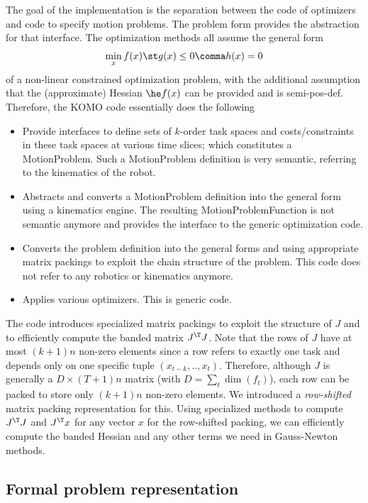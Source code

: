 \documentclass[10pt,fleqn,twoside]{article}
\begin{document}
{{The goal of the implementation is the separation between the code of
optimizers and code to specify motion problems. The problem
form  provides the abstraction for that interface. The
optimization methods all assume the general form
\begin{align}\label{eqOpt}
\min_x f(x) \st g(x)\le 0 \comma h(x) = 0
\end{align}
of a non-linear constrained optimization problem, with the additional
assumption that the (approximate) Hessian $\he f(x)$ can be provided
and is semi-pos-def. Therefore, the KOMO code essentially does the
following
\begin{itemize}
\item Provide interfaces to define sets of $k$-order task spaces and
costs/constraints in these task spaces at various time slices; which
constitutes a MotionProblem. Such a MotionProblem definition is very
semantic, referring to the kinematics of the robot.
\item Abstracts and converts a MotionProblem definition into the general
form  using a kinematics engine. The resulting
MotionProblemFunction is not semantic anymore and provides the
interface to the generic optimization code.
\item Converts the problem definition  into the general
forms  and  using appropriate matrix packings
to exploit the chain structure of the problem. This code does not
refer to any robotics or kinematics anymore.
\item Applies various optimizers. This is generic code.
\end{itemize}

The code introduces specialized matrix packings to exploit the
structure of $J$ and to efficiently compute the banded matrix $J^\T
J$. Note that the rows of $J$ have at most $(k+1)n$ non-zero elements
since a row refers to exactly one task and depends only on one
specific tuple $(x_{t-k},..,x_t)$. Therefore, although $J$ is
generally a $D\times (T+1)n$ matrix (with $D=\sum_t \dim(f_t)$),
each row can be packed to store only $(k+1)n$ non-zero elements. We
introduced a \emph{row-shifted} matrix packing representation for
this. Using specialized methods to compute $J^\T J$ and $J^\T x$ for
any vector $x$ for the row-shifted packing, we can efficiently compute
the banded Hessian and any other terms we need in Gauss-Newton
methods.


\subsection{Formal problem representation}

}}
\end{document}
